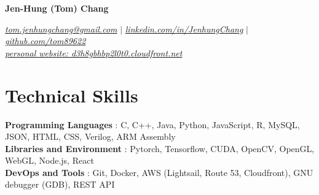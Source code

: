 \documentclass[letterpaper,11pt]{article}
\newcommand{\namespace}{
\vspace{3pt}
}
\newcommand{\sectionspace}{
\vspace{-20pt}
}
\newcommand{\subheadingtitlevspace}{
\vspace{-3pt}
}
\newcommand{\titleItem}[1]{
  \textbf{#1}
}
\begin{document}
\begin{center}
    \textbf{\Huge{\center Jen-Hung (Tom) Chang }} \\
    \namespace
    \href{mailto:tom.jenhungchang@gmail.com}{{\textit{tom.jenhungchang@gmail.com}}} $|$ 
    \href{https://linkedin.com/in/JenhungChang}{{\textit{linkedin.com/in/JenhungChang}}} $|$
    \href{https://github.com/tom89622}{{\textit{github.com/tom89622}}}
    \\\href{https://d3h8gbhbp2l0t0.cloudfront.net}{{\textit{personal website: d3h8gbhbp2l0t0.cloudfront.net}}}
    \vspace{-8pt}
\end{center}



    

\section{Technical Skills}
\subheadingtitlevspace
  \begin{itemize}[leftmargin=0in, label={}]
    {\item{
      \titleItem{Programming Languages}{: C, C++, Java, Python, JavaScript, R, MySQL, JSON, HTML, CSS, Verilog, ARM Assembly} \\
      \titleItem{Libraries and Environment}{: Pytorch, Tensorflow, CUDA, OpenCV, OpenGL, WebGL, Node.js, React} \\
      \titleItem{DevOps and Tools}{: Git, Docker, AWS (Lightsail, Route 53, Cloudfront), GNU debugger (GDB), REST API} \\
    }}
  \end{itemize}
\sectionspace
\end{document}
